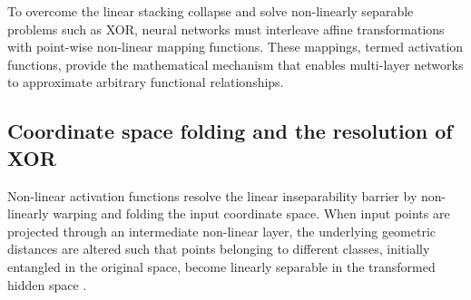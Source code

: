 \documentclass[../../main.tex]{subfiles}
\begin{document}
To overcome the linear stacking collapse and solve non-linearly separable problems such as XOR, neural networks must interleave affine transformations with point-wise non-linear mapping functions. These mappings, termed activation functions, provide the mathematical mechanism that enables multi-layer networks to approximate arbitrary functional relationships.

\subsection{Coordinate space folding and the resolution of XOR}
\label{subsec:coordinate_space_folding}

Non-linear activation functions resolve the linear inseparability barrier by non-linearly warping and folding the input coordinate space. When input points are projected through an intermediate non-linear layer, the underlying geometric distances are altered such that points belonging to different classes, initially entangled in the original space, become linearly separable in the transformed hidden space \citep{goodfellow2016}.
\end{document}
